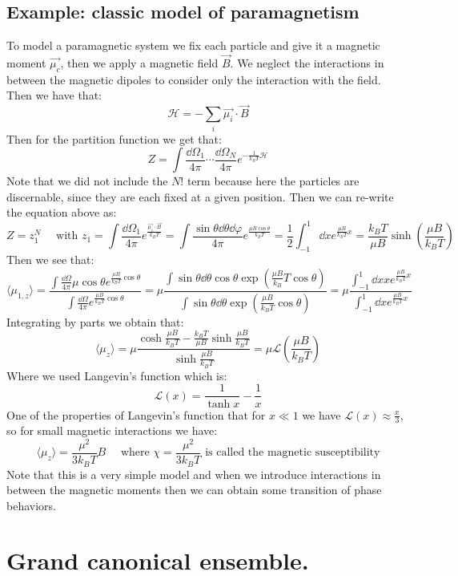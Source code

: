 \documentclass[10pt,a4paper]{book}
\begin{document}
\section{Example: classic model of paramagnetism}
To model a paramagnetic system we fix each particle and give it a magnetic moment $\vec{\mu_c}$, then we apply a magnetic field $\vec{B}$. We neglect the interactions in between the magnetic dipoles to consider only the interaction with the field. Then we have that:
\[
\mathcal{H} = - \sum_i \vec{\mu_i} \cdot \vec{B}
\]
Then for the partition function we get that:
\[
Z = \int \frac{\dd \Omega_1}{4\pi} \cdots \frac{\dd \Omega_N}{4\pi} e^{-\frac{1}{k_B T} \mathcal{H}}
\]
Note that we did not include the $N!$ term because here the particles are discernable, since they are each fixed at a given position. Then we can re-write the equation above as:
\[
Z = z_1^N \quad \text{ with } z_1 = \int \frac{\dd \Omega_1}{4\pi} e^{\frac{\vec{\mu_1}\cdot \vec{B}}{k_B T}} = \int \frac{\sin \theta \dd \theta \dd \varphi}{4 \pi} e^{\frac{\mu B \cos \theta}{k_B T}} = \frac{1}{2} \int_{-1}^{1}\dd x e^{\frac{\mu B}{k_B T}x} = \frac{k_B T}{\mu B} \sinh (\frac{\mu B}{k_B T})
\]
Then we see that:
\[
\langle \mu_{1,z} \rangle = \frac{\int \frac{\dd \Omega}{4 \pi} \mu \cos \theta e^{\frac{\mu B}{k_B T} \cos \theta}}{\int \frac{\dd \Omega}{4\pi} e^{\frac{\mu B}{k_B T}\cos\theta}} = \mu \frac{\int \sin \theta \dd \theta \cos \theta \exp(\frac{\mu B}{k_B}T \cos\theta)}{\int \sin \theta \dd \theta \exp(\frac{\mu B}{k_B T} \cos \theta)} = \mu \frac{\int_{-1}^1 \dd x x e^{\frac{\mu B}{k_B T} x}}{\int_{-1}^1 \dd x e^{\frac{\mu B}{k_B T} x}}
\]
Integrating by parts we obtain that:
\[
\langle \mu_z \rangle = \mu \frac{\cosh \frac{\mu B}{k_B T} - \frac{k_B T}{\mu B} \sinh \frac{\mu B}{k_B T}}{\sinh \frac{\mu B}{k_B T}} = \mu \mathcal{L}(\frac{\mu B}{k_B T})
\]
Where we used Langevin's function which is:
\[
\mathcal{L}(x) = \frac{1}{\tanh x} - \frac{1}{x}
\]
One of the properties of Langevin's function that for $x \ll 1$ we have $\mathcal{L}(x) \approx \frac{x}{3}$, so for small magnetic interactions we have:
\[
\langle \mu_z \rangle = \frac{\mu^2}{3 k_B T} B \quad \text{ where } \chi = \frac{\mu^2}{3 k_B T} \text{ is called the magnetic susceptibility}
\]
Note that this is a very simple model and when we introduce interactions in between the magnetic moments then we can obtain some transition of phase behaviors.

\chapter{Grand canonical ensemble.}
\end{document}
